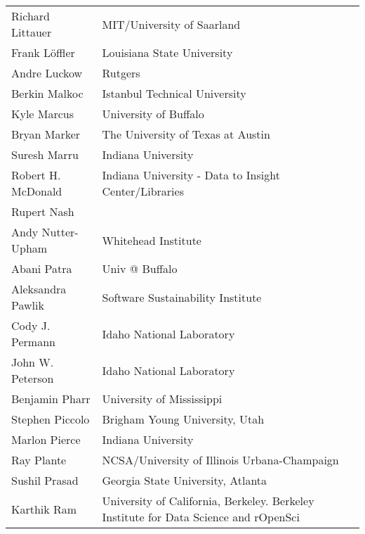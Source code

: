 \documentclass[11pt, oneside]{amsart}
\begin{document}
\begin{longtable}{ll}
Richard Littauer      &  MIT/University of Saarland                                           \\
Frank L\"{o}ffler     &  Louisiana State University                                           \\
Andre Luckow          &  Rutgers                                                              \\
Berkin Malkoc         &  Istanbul Technical University                                        \\
Kyle Marcus           &  University of Buffalo                                                \\
Bryan Marker          &  The University of Texas at Austin                                    \\
Suresh Marru          &  Indiana University                                                   \\
Robert H. McDonald    &  Indiana University - Data to Insight Center/Libraries                \\
Rupert Nash           \\
Andy Nutter-Upham     &  Whitehead Institute                                                  \\
Abani Patra           &  Univ @ Buffalo                                                       \\
Aleksandra Pawlik     &  Software Sustainability Institute                                    \\
Cody J. Permann       &  Idaho National Laboratory                                            \\
John W. Peterson      &  Idaho National Laboratory                                            \\
Benjamin Pharr        &  University of Mississippi                                            \\
Stephen Piccolo       &  Brigham Young University, Utah                                       \\
Marlon Pierce         &  Indiana University                                                   \\
Ray Plante            &  NCSA/University of Illinois Urbana-Champaign                         \\
Sushil Prasad         &  Georgia State University, Atlanta                                    \\
Karthik Ram                   &  University of California, Berkeley. Berkeley Institute for Data Science and rOpenSci \\

\end{longtable}
\end{document}
